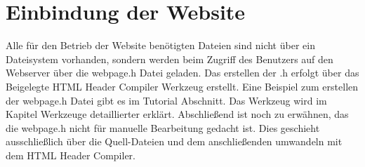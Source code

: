 \section{Einbindung der Website}

Alle für den Betrieb der Website benötigten Dateien sind nicht über ein
Dateisystem vorhanden, sondern werden beim Zugriff des Benutzers auf den
Webserver über die \textrm{webpage.h} Datei geladen.
Das erstellen der .h erfolgt über das Beigelegte \textrm{HTML Header Compiler}
Werkzeug erstellt. Eine Beispiel zum erstellen der \textrm{webpage.h} Datei gibt
es im Tutorial Abschnitt. Das Werkzeug wird im Kapitel Werkzeuge detaillierter
erklärt. Abschließend ist noch zu erwähnen, das die \textrm{webpage.h} nicht für manuelle
Bearbeitung gedacht ist. Dies geschieht ausschließlich über die Quell-Dateien
und dem anschließenden umwandeln mit dem \textrm{HTML Header Compiler}.


